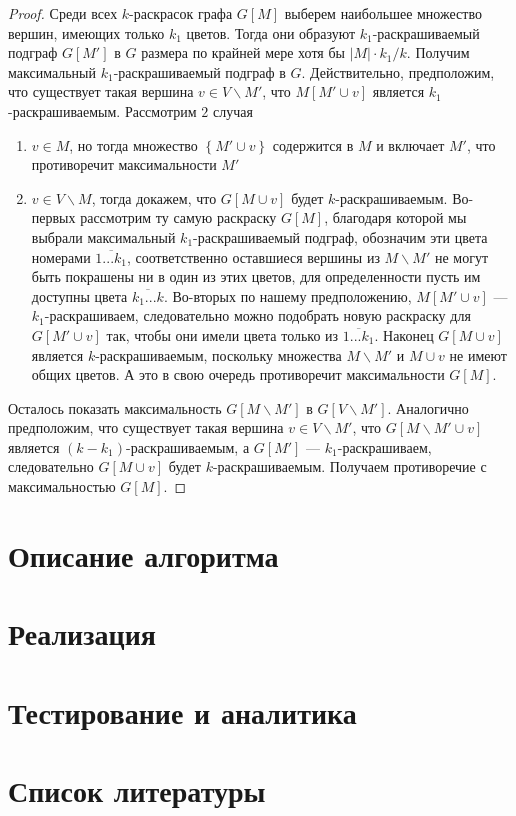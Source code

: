 \documentclass[12pt]{article}
\begin{document}
\begin{proof}
Среди всех $k$-раскрасок графа $G\left[M\right]$ выберем наибольшее множество вершин, имеющих только $k_1$ цветов. Тогда они образуют $k_1$-раскрашиваемый подграф $G\left[M'\right]$ в $G$ размера по крайней мере хотя бы $\left|M\right| \cdot k_1/k$. Получим максимальный $k_1$-раскрашиваемый подграф в $G$. Действительно, предположим, что существует такая вершина $v \in V \backslash M'$, что $M\left[M' \cup v\right]$ является $k_1$-раскрашиваемым. Рассмотрим $2$ случая 
	\begin{enumerate}
		\item $v \in M$, но тогда множество $\left\{M' \cup v\right\}$ содержится в $M$ и включает $M'$, что противоречит максимальности $M'$
		\item $v \in V \backslash M$, тогда докажем, что $G\left[M \cup v\right]$ будет $k$-раскрашиваемым. Во-первых рассмотрим ту самую раскраску $G\left[M\right]$, благодаря которой мы выбрали максимальный $k_1$-раскрашиваемый подграф, обозначим эти цвета номерами $\overline{1...k_1}$, соответственно оставшиеся вершины из $M \backslash M'$ не могут быть покрашены ни в один из этих цветов, для определенности пусть им доступны цвета $\overline{k_1...k}$. Во-вторых по нашему предположению, $M\left[M' \cup v\right]$ --- $k_1$-раскрашиваем, следовательно можно подобрать новую раскраску для $G\left[M'\cup v\right]$ так, чтобы они имели цвета только из $\overline{1...k_1}$. Наконец $G\left[M \cup v\right]$ является $k$-раскрашиваемым, поскольку множества $M \backslash M'$ и $M \cup v$  не имеют общих цветов. А это в свою очередь противоречит максимальности $G\left[M\right]$.
	\end{enumerate} 
	Осталось показать максимальность $G\left[M \backslash M'\right]$ в $G\left[V \backslash M'\right]$. Аналогично предположим, что существует такая вершина $v \in V \backslash M'$, что $G\left[M \backslash M' \cup v\right]$ является $\left(k - k_1\right)$-рас\-кра\-ши\-ва\-е\-мым, а $G\left[M'\right]$ --- $k_1$-раскрашиваем, следовательно $G\left[M \cup v\right]$ будет $k$-раскрашиваемым. Получаем противоречие с максимальностью $G\left[M\right]$.
\end{proof}

\section{Описание алгоритма}

\section{Реализация}

\section{Тестирование и аналитика}

\section{Список литературы}

\newpage
\tableofcontents
\end{document}
